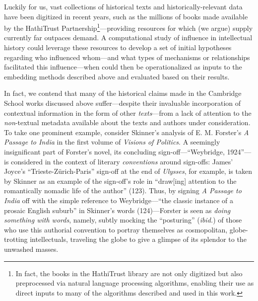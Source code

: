 \documentclass[11pt]{article}
\begin{document}
 
Luckily for us, vast collections of historical texts and historically-relevant data have been digitized in recent years, such as the millions of books made available by the HathiTrust Partnership\footnote{In fact, the books in the HathiTrust library are not only digitized but also preprocessed via natural language processing algorithms, enabling their use as direct inputs to many of the algorithms described and used in this work.}---providing resources for which (we argue) supply currently far outpaces demand. A computational study of influence in intellectual history could leverage these resources to develop a set of initial hypotheses regarding who influenced whom---and what types of mechanisms or relationships facilitated this influence---when could then be operationalized as inputs to the embedding methods described above and evaluated based on their results.

In fact, we contend that many of the historical claims made in the Cambridge School works discussed above suffer---despite their invaluable incorporation of contextual information in the form of other \textit{texts}---from a lack of attention to the \textit{non}-textual metadata available about the texts and authors under consideration. To take one prominent example, consider Skinner's analysis of E. M. Forster's \textit{A Passage to India} in the first volume of \textit{Visions of Politics}. A seemingly insignificant part of Forster's novel, its concluding sign-off---``Weybridge, 1924''---is considered in the context of literary \textit{conventions} around sign-offs: James' Joyce's ``Trieste-Zürich-Paris'' sign-off at the end of \textit{Ulysses}, for example, is taken by Skinner as an example of the sign-off's role in ``draw[ing] attention to the romantically nomadic life of the author'' (123). Thus, by signing \textit{A Passage to India} off with the simple reference to Weybridge---``the classic instance of a prosaic English suburb'' in Skinner's words (124)---Forster is seen as \textit{doing something with words}, namely, subtly mocking the ``posturing'' (\textit{ibid.}) of those who use this authorial convention to portray themselves as cosmopolitan, globe-trotting intellectuals, traveling the globe to give a glimpse of its splendor to the unwashed masses.
\end{document}
